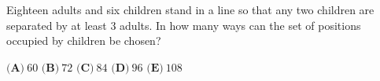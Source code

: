 Eighteen adults and six children stand in a line so that any two children are separated by at least $3$ adults. In how many ways can the set of positions occupied by children be chosen?

$\textbf{(A)}\ 60$ \qquad $\textbf{(B)}\ 72$ \qquad $\textbf{(C)}\ 84$ \qquad $\textbf{(D)}\ 96$ \qquad $\textbf{(E)}\ 108$
